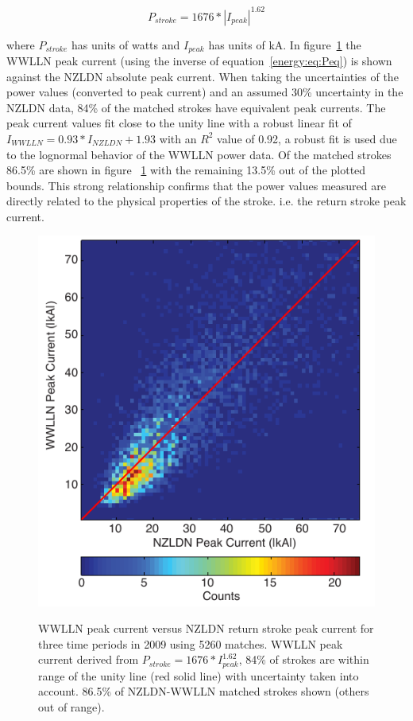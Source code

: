 \begin{equation}
P_{stroke} = 1676 * |I_{peak}|^{1.62}
\label{energy:eq:Peq}
\end{equation}

where $P_{stroke}$ has units of watts and $I_{peak}$ has units of kA.
In figure~\ref{energy:fig:pvi} the WWLLN peak current (using the inverse of equation~\ref{energy:eq:Peq}) is shown against the NZLDN absolute peak current.
When taking the uncertainties of the power values (converted to peak current) and an assumed 30\% uncertainty in the NZLDN data, 84\% of the matched strokes have equivalent peak currents.
The peak current values fit close to the unity line with a robust linear fit of $I_{WWLLN}=0.93*I_{NZLDN}+1.93$ with an $R^2$ value of 0.92, a robust fit is used due to the lognormal behavior of the WWLLN power data.
Of the matched strokes 86.5\% are shown in figure~ \ref{energy:fig:pvi} with the remaining 13.5\% out of the plotted bounds.
This strong relationship confirms that the power values measured are directly related to the physical properties of the stroke. i.e. the return stroke peak current.

\begin{figure}[ht!]
\centering
\includegraphics[scale=1]{energy/Figures/PPS_PvI_Error.pdf}\\
\caption{WWLLN peak current versus NZLDN return stroke peak current for three time periods in 2009 using 5260 matches. WWLLN peak current derived from $P_{stroke} = 1676 * I_{peak}^{1.62}$, 84\% of strokes are within range of the unity line (red solid line) with uncertainty taken into account. 86.5\% of NZLDN-WWLLN matched strokes shown (others out of range).}
\label{energy:fig:pvi}
\end{figure}


